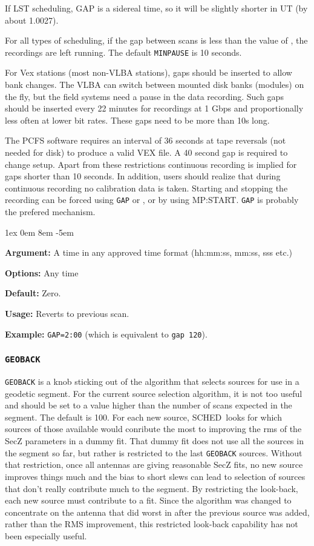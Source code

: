 \documentclass{report}
\newcommand{\schedb}{{\sc SCHED~}}
\newcommand{\rcwbox}[5]{
  \begin{list}{}{\parsep 1ex  \itemsep 0em
                 \leftmargin 8em  \itemindent -5em }
    \item {\bf Argument:} #1
    \item {\bf Options:}  #2
    \item {\bf Default:}  #3
    \item {\bf Usage:}    #4
    \item {\bf Example:}  #5
  \end{list}
}
\begin{document}
If LST scheduling, GAP is a sidereal time, so it will be slightly
shorter in UT (by about 1.0027).

For all types of scheduling, if the gap between scans is less than the
value of , the recordings are
left running.  The default {\tt MINPAUSE} is 10 seconds.

For Vex stations (most non-VLBA stations), gaps should be inserted to
allow bank changes.  The VLBA can switch between mounted disk banks
(modules) on the fly, but the field systems need a pause in the data
recording.  Such gaps should be inserted every 22 minutes for
recordings at 1 Gbps and proportionally less often at lower bit rates.
These gaps need to be more than 10s long.

The PCFS software requires an interval of 36 seconds at tape reversals
(not needed for disk) to produce a valid VEX file. A 40 second gap is
required to change setup.  Apart from these restrictions continuous
recording is implied for gaps shorter than 10 seconds.  In addition,
users should realize that during continuous recording no calibration
data is taken. Starting and stopping the recording can be forced using
{\tt GAP} or , or by using
 {MP:START}.  {\tt GAP} is probably the
prefered mechanism.

\rcwbox
{A time in any approved time format (hh:mm:ss, mm:ss, sss etc.)}
{Any time}
{Zero.}
{Reverts to previous scan.}
{{\tt GAP=2:00} (which is equivalent to {\tt gap 120}).}


\subsubsection{\label{MP:GEOBACK}{\tt GEOBACK}}

{\tt GEOBACK} is a knob sticking out of the algorithm that selects
sources for use in a geodetic segment.  For the current source
selection algorithm, it is not too useful and should be set to a value
higher than the number of scans expected in the segment.  The default
is 100.  For each new source, \schedb looks for which sources of those
available would conribute the most to improving the rms of the SecZ
parameters in a dummy fit.  That dummy fit does not use all the
sources in the segment so far, but rather is restricted to the last
{\tt GEOBACK} sources.  Without that restriction, once all antennas
are giving reasonable SecZ fits, no new source improves things much
and the bias to short slews can lead to selection of sources that
don't really contribute much to the segment.  By restricting the
look-back, each new source must contribute to a fit.  Since the
algorithm was changed to concentrate on the antenna that did worst in
after the previous source was added, rather than the RMS improvement,
this restricted look-back capability has not been especially useful.
\end{document}
